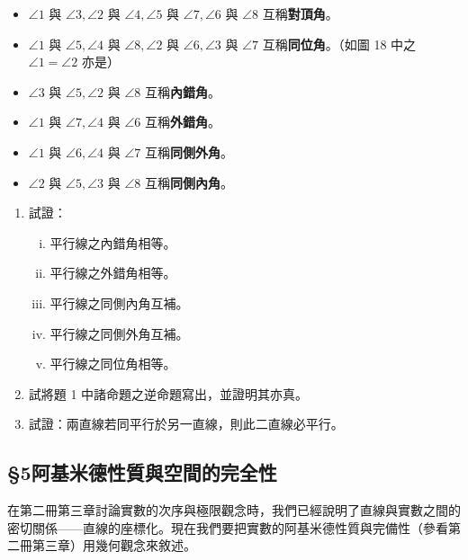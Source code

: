 \begin{itemize}[leftmargin=2em]
  \item $\angle 1$ 與 $\angle 3, \angle 2$ 與 $\angle 4, \angle 5$ 與 $\angle 7, \angle 6$ 與 $\angle 8$ 互稱\textbf{對頂角}。
  \item $\angle 1$ 與 $\angle 5, \angle 4$ 與 $\angle 8, \angle 2$ 與 $\angle 6, \angle 3$ 與 $\angle 7$ 互稱\textbf{同位角}。（如圖 18 中之 $\angle 1 = \angle 2$ 亦是）
  \item $\angle 3$ 與 $\angle 5, \angle 2$ 與 $\angle 8$ 互稱\textbf{內錯角}。
  \item $\angle 1$ 與 $\angle 7, \angle 4$ 與 $\angle 6$ 互稱\textbf{外錯角}。
  \item $\angle 1$ 與 $\angle 6, \angle 4$ 與 $\angle 7$ 互稱\textbf{同側外角}。
  \item $\angle 2$ 與 $\angle 5, \angle 3$ 與 $\angle 8$ 互稱\textbf{同側內角}。
\end{itemize}

\begin{enumerate}[1., leftmargin=2em]
  \item 試證：
  \begin{enumerate}[(i)]
    \item 平行線之內錯角相等。
    \item 平行線之外錯角相等。
    \item 平行線之同側內角互補。
    \item 平行線之同側外角互補。
    \item 平行線之同位角相等。
  \end{enumerate}
  \item 試將題 1 中諸命題之逆命題寫出，並證明其亦真。
  \item 試證：兩直線若同平行於另一直線，則此二直線必平行。
\end{enumerate}

\subsection*{\S 5\quad 阿基米德性質與空間的完全性}
\label{sec:b3_a1_5}

在第二冊第三章討論實數的次序與極限觀念時，我們已經說明了直線與實數之間的密切關係——直線的座標化。現在我們要把實數的阿基米德性質與完備性（參看第二冊第三章）用幾何觀念來敘述。


